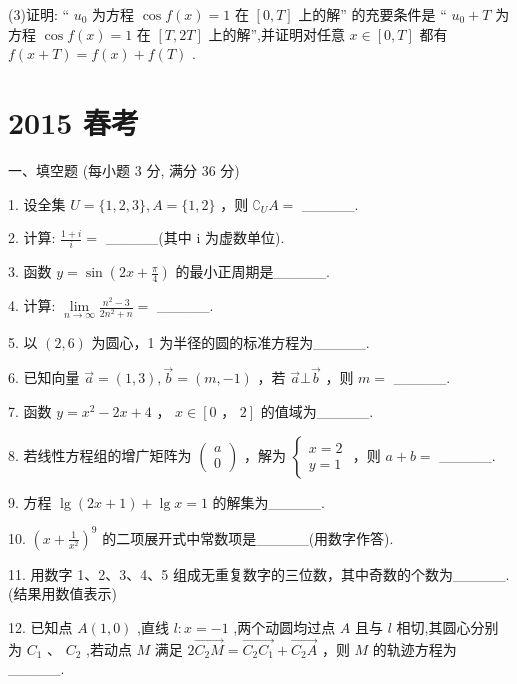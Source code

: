 \documentclass[10pt]{article}
\begin{document}
(3)证明: “ \({u}_{0}\) 为方程 \(\cos f\left( x\right)  = 1\) 在 \(\left\lbrack  {0,T}\right\rbrack\) 上的解” 的充要条件是 “ \({u}_{0} + T\) 为方程 \(\cos f\left( x\right)  = 1\) 在 \(\left\lbrack  {T,{2T}}\right\rbrack\) 上的解”,并证明对任意 \(x \in  \left\lbrack  {0,T}\right\rbrack\) 都有 \(f\left( {x + T}\right)  = f\left( x\right)  + f\left( T\right)\) .

\section*{2015 春考}

一、填空题 (每小题 3 分, 满分 36 分)

1. 设全集 \(U = \{ 1,2,3\} ,A = \{ 1,2\}\) ，则 \({\complement }_{U}A =\) \_\_\_\_\_.

2. 计算: \(\frac{1 + i}{i} =\) \_\_\_\_\_(其中 i 为虚数单位).

3. 函数 \(y = \sin \left( {{2x} + \frac{\pi }{4}}\right)\) 的最小正周期是\_\_\_\_\_.

4. 计算: \(\mathop{\lim }\limits_{{n \rightarrow  \infty }}\frac{{n}^{2} - 3}{2{n}^{2} + n} =\) \_\_\_\_\_.

5. 以 \(\left( {2,6}\right)\) 为圆心，1 为半径的圆的标准方程为\_\_\_\_\_.

6. 已知向量 \(\overrightarrow{a} = \left( {1,3}\right) ,\overrightarrow{b} = \left( {m, - 1}\right)\) ，若 \(\overrightarrow{a}\bot \overrightarrow{b}\) ，则 \(m =\) \_\_\_\_\_.

7. 函数 \(y = {x}^{2} - {2x} + 4\) ， \(x \in  \left\lbrack  {0\text{ ， }2}\right\rbrack\) 的值域为\_\_\_\_\_.

8. 若线性方程组的增广矩阵为 \(\left( \begin{array}{l} a \\  0 \end{array}\right)\) ，解为 \(\left\{  \begin{array}{l} x = 2 \\  y = 1 \end{array}\right.\) ，则 \(a + b =\) \_\_\_\_\_.

9. 方程 \(\lg \left( {{2x} + 1}\right)  + \lg x = 1\) 的解集为\_\_\_\_\_.

10. \({\left( x + \frac{1}{{x}^{2}}\right) }^{9}\) 的二项展开式中常数项是\_\_\_\_\_(用数字作答).

11. 用数字 1、2、3、4、5 组成无重复数字的三位数，其中奇数的个数为\_\_\_\_\_. (结果用数值表示)

12. 已知点 \(A\left( {1,0}\right)\) ,直线 \(l : x =  - 1\) ,两个动圆均过点 \(A\) 且与 \(l\) 相切,其圆心分别为 \({C}_{1}\text{ 、 }{C}_{2}\) ,若动点 \(M\) 满足 \(2\overrightarrow{{C}_{2}M} = \overrightarrow{{C}_{2}{C}_{1}} + \overrightarrow{{C}_{2}A}\) ，则 \(M\) 的轨迹方程为\_\_\_\_\_.
\end{document}

